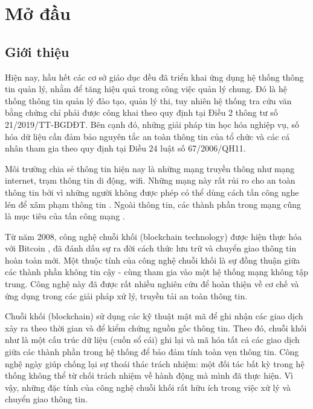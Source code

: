 \chapter{Mở đầu}

\section{Giới thiệu}
Hiện nay, hầu hết các cơ sở giáo dục đều đã triển khai ứng dụng hệ thống thông tin quản lý, nhằm để tăng hiệu quả trong công việc quản lý chung.
Đó là hệ thống thông tin quản lý đào tạo, quản lý thi, tuy nhiên hệ thống tra cứu văn bằng chứng chỉ phải được công khai theo quy định tại Điều 2 thông tư số 21/2019/TT-BGDĐT.
Bên cạnh đó, những giải pháp tin học hóa nghiệp vụ, số hóa dữ liệu cần đảm bảo nguyên tắc an toàn thông tin của tổ chức và các cá nhân tham gia theo quy định tại Điều 24 luật số 67/2006/QH11.

Môi trường chia sẻ thông tin hiện nay là những mạng truyền thông như mạng internet, trạm thông tin di động, wifi. Những mạng này rất rủi ro cho an toàn thông tin bởi vì những người không được phép có thể dùng cách tấn công nghe lén để xâm phạm thông tin \cite{phạmnguyênkhang2013}. Ngoài thông tin, các thành phần trong mạng cũng là mục tiêu của tấn công mạng \cite{dothanhnghi2018}.

Từ năm 2008, công nghệ chuỗi khối (blockchain technology) được hiện thực hóa với Bitcoin \cite{nakamoto2008bitcoin}, đã đánh dấu sự ra đời cách thức lưu trữ và chuyển giao thông tin hoàn toàn mới.
Một thuộc tính của công nghệ chuỗi khối là sự đồng thuận giữa các thành phần không tin cậy - cùng tham gia vào một hệ thống mạng không tập trung. Công nghệ này đã được rất nhiều nghiên cứu \cite{10.1145/3190508.3190538, ANTWI2021100012, fair2019, 8246573, Fang2020} để hoàn thiện về cơ chế và ứng dụng trong các giải pháp xử lý, truyền tải an toàn thông tin.

Chuỗi khối (blockchain) sử dụng các kỹ thuật mật mã \cite{lequyetthang2016, christofpaar2015, ralphcharlesmerkle1979, shannon-otp} để ghi nhận các giao dịch xảy ra theo thời gian và để kiểm chứng nguồn gốc thông tin.
Theo đó, chuỗi khối như là một cấu trúc dữ liệu (cuốn sổ cái) ghi lại và mã hóa tất cả các giao dịch giữa các thành phần trong hệ thống để bảo đảm tính toàn vẹn thông tin. Công nghệ ngày giúp chống lại sự thoái thác trách nhiệm: một đối tác bất kỳ trong hệ thống không thể từ chối trách nhiệm về hành động mà mình đã thực hiện.
Vì vậy, những đặc tính của công nghệ chuỗi khối rất hữu ích trong việc xử lý và chuyển giao thông tin.

